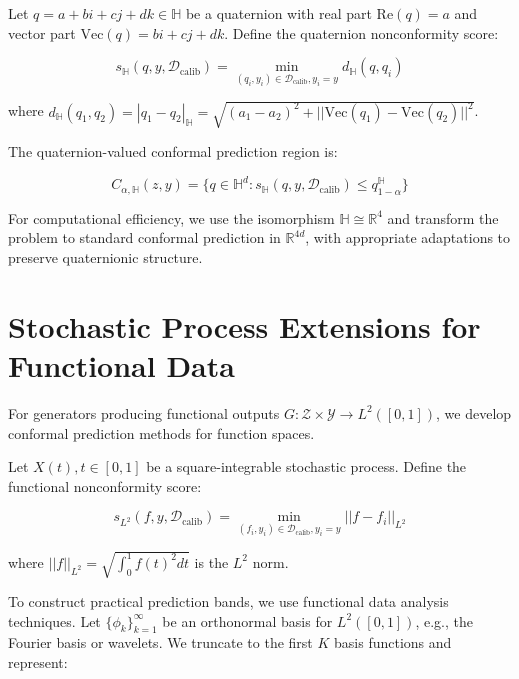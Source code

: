 \documentclass{article}
\theoremstyle{plain}
\theoremstyle{definition}
\theoremstyle{remark}
\begin{document}
Let $q = a + bi + cj + dk \in \mathbb{H}$ be a quaternion with real part $\text{Re}(q) = a$ and vector part $\text{Vec}(q) = bi + cj + dk$. Define the quaternion nonconformity score:

\begin{equation}
s_{\mathbb{H}}(q, y, \mathcal{D}_{\text{calib}}) = \min_{(q_i, y_i) \in \mathcal{D}_{\text{calib}}, y_i = y} d_{\mathbb{H}}(q, q_i)
\end{equation}

where $d_{\mathbb{H}}(q_1, q_2) = |q_1 - q_2|_{\mathbb{H}} = \sqrt{(a_1 - a_2)^2 + ||\text{Vec}(q_1) - \text{Vec}(q_2)||^2}$.

The quaternion-valued conformal prediction region is:

\begin{equation}
C_{\alpha, \mathbb{H}}(z, y) = \{q \in \mathbb{H}^d : s_{\mathbb{H}}(q, y, \mathcal{D}_{\text{calib}}) \leq q_{1-\alpha}^{\mathbb{H}}\}
\end{equation}

For computational efficiency, we use the isomorphism $\mathbb{H} \cong \mathbb{R}^4$ and transform the problem to standard conformal prediction in $\mathbb{R}^{4d}$, with appropriate adaptations to preserve quaternionic structure.

\section{Stochastic Process Extensions for Functional Data}

For generators producing functional outputs $G: \mathcal{Z} \times \mathcal{Y} \rightarrow L^2([0, 1])$, we develop conformal prediction methods for function spaces.

Let $X(t), t \in [0, 1]$ be a square-integrable stochastic process. Define the functional nonconformity score:

\begin{equation}
s_{L^2}(f, y, \mathcal{D}_{\text{calib}}) = \min_{(f_i, y_i) \in \mathcal{D}_{\text{calib}}, y_i = y} ||f - f_i||_{L^2}
\end{equation}

where $||f||_{L^2} = \sqrt{\int_0^1 f(t)^2 dt}$ is the $L^2$ norm.

To construct practical prediction bands, we use functional data analysis techniques. Let $\{\phi_k\}_{k=1}^{\infty}$ be an orthonormal basis for $L^2([0, 1])$, e.g., the Fourier basis or wavelets. We truncate to the first $K$ basis functions and represent:
\end{document}
